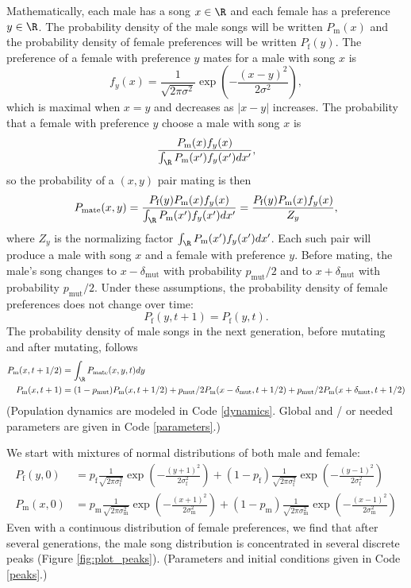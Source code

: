 \documentclass{article}\usepackage[]{graphicx}\usepackage[]{color}
\begin{document}
Mathematically, each male has a song $x\in \R$ and each female has a preference $y\in\R$. The probability density of the male songs will be written $P_\text{m}(x)$ and the probability density of female preferences will be written $P_\text{f}(y)$. The preference of a female with preference $y$ mates for a male with song $x$ is 
\begin{equation*}
f_y(x)=\frac{1}{\sqrt{2 \pi \sigma^2}}\exp\left(-\frac{(x-y)^2}{2\sigma^2}\right),
\end{equation*}
which is maximal when $x=y$ and decreases as $|x-y|$ increases. The probability that a female with preference $y$ choose a male with song $x$ is 
\begin{equation*}
\frac{P_\text{m}(x)f_y(x)}{\int_\R P_\text{m}(x')f_y(x')dx'},
\end{equation*}
so the probability of a $(x,y)$ pair mating is then
\begin{equation*}
P_\text{mate}(x,y)=\frac{P_\text{f}(y)P_\text{m}(x)f_y(x)}{\int_\R P_\text{m}(x')f_y(x')dx'}=\frac{P_\text{f}(y)P_\text{m}(x)f_y(x)}{Z_y},
\end{equation*}
where $Z_y$ is the normalizing factor $\int_\R P_\text{m}(x')f_y(x')dx'$.
Each such pair will produce a male with song $x$ and a female with preference $y$. Before mating, the male's song changes to $x-\delta_\text{mut}$ with probability $p_\text{mut}/2$ and to $x+\delta_\text{mut}$ with probability $p_\text{mut}/2$. Under these assumptions, the probability density of female preferences does not change over time:
\begin{equation*}
P_\text{f}(y,t+1)=P_\text{f}(y,t).
\end{equation*}
The probability density of male songs in the next generation, before mutating and after mutating, follows
\begin{align*}
P_\text{m}(x,t+1/2)&=\int_\R P_\text{mate}(x,y,t) dy
\\P_\text{m}(x,t+1)&=(1-p_\text{mut})P_\text{m}(x,t+1/2)+p_\text{mut}/2P_\text{m}(x-\delta_\text{mut},t+1/2)+p_\text{mut}/2P_\text{m}(x+\delta_\text{mut},t+1/2)
\end{align*}
 (Population dynamics are modeled in Code \ref{dynamics}. Global and / or needed parameters are given in Code \ref{parameters}.)

We start with mixtures of normal distributions of both male and female:
\begin{align*}
P_\text{f}(y,0)&=p_\text{f}\frac{1}{\sqrt{2\pi\sigma_\text{f}^2}}\exp\left(-\frac{(y+1)^2}{2\sigma_\text{f}^2}\right)+(1-p_\text{f})\frac{1}{\sqrt{2\pi\sigma_\text{f}^2}}\exp\left(-\frac{(y-1)^2}{2\sigma_\text{f}^2}\right)
\\P_\text{m}(x,0)&=p_\text{m}\frac{1}{\sqrt{2\pi\sigma_\text{m}^2}}\exp\left(-\frac{(x+1)^2}{2\sigma_\text{m}^2}\right)+(1-p_\text{m})\frac{1}{\sqrt{2\pi\sigma_\text{m}^2}}\exp\left(-\frac{(x-1)^2}{2\sigma_\text{m}^2}\right)
\end{align*}
Even with a continuous distribution of female preferences, we find that after several generations, the male song distribution is concentrated in several discrete peaks (Figure \ref{fig:plot_peaks}). (Parameters and initial conditions given in Code \ref{peaks}.)
\end{document}
